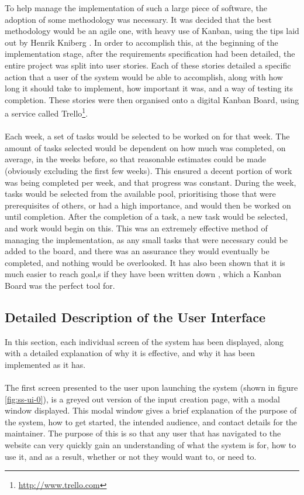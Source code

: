 To help manage the implementation of such a large piece of software, the adoption of some methodology was necessary. It was decided that the best methodology would be an agile one, with heavy use of Kanban, using the tips laid out by Henrik Kniberg \cite{kniberg2007scrum}. In order to accomplish this, at the beginning of the implementation stage, after the requirements specification had been detailed, the entire project was split into user stories. Each of these stories detailed a specific action that a user of the system would be able to accomplish, along with how long it should take to implement, how important it was, and a way of testing its completion. These stories were then organised onto a digital Kanban Board, using a service called Trello\footnote{\url{http://www.trello.com}}. \ \\
\ \\
Each week, a set of tasks would be selected to be worked on for that week. The amount of tasks selected would be dependent on how much was completed, on average, in the weeks before, so that reasonable estimates could be made (obviously excluding the first few weeks). This ensured a decent portion of work was being completed per week, and that progress was constant. During the week, tasks would be selected from the available pool, prioritising those that were prerequisites of others, or had a high importance, and would then be worked on until completion. After the completion of a task, a new task would be selected, and work would begin on this. This was an extremely effective method of managing the implementation, as any small tasks that were necessary could be added to the board, and there was an assurance they would eventually be completed, and nothing would be overlooked. It has also been shown that it is much easier to reach goal,s if they have been written down \cite{wilson2008goal}, which a Kanban Board was the perfect tool for.

\newpage 
\subsection{Detailed Description of the User Interface}
In this section, each individual screen of the system has been displayed, along with a detailed explanation of why it is effective, and why it has been implemented as it has.\ \\
\ \\
The first screen presented to the user upon launching the system (shown in figure \ref{fig:ss-ui-0}), is a greyed out version of the input creation page, with a modal window displayed. This modal window gives a brief explanation of the purpose of the system, how to get started, the intended audience, and contact details for the maintainer. The purpose of this is so that any user that has navigated to the website can very quickly gain an understanding of what the system is for, how to use it, and as a result, whether or not they would want to, or need to.

